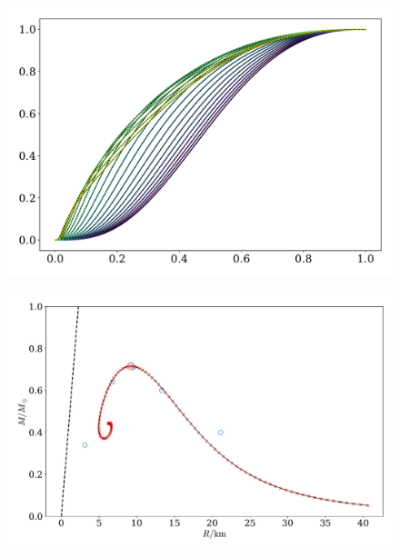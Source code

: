 \begin{figure}
    \centering
    \vspace{-2cm}
    \includegraphics[width=\textwidth]{../scripts/figurer/mass.pdf}
\end{figure}

\begin{figure}
    \centering
    \includegraphics[width=\textwidth]{../scripts/figurer/mass_radius.pdf}
\end{figure}


